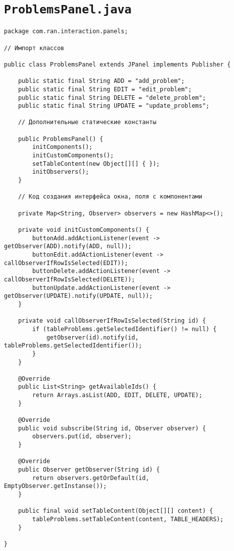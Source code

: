 \section*{\texttt{ProblemsPanel.java}}
\begin{verbatim}
package com.ran.interaction.panels;

// Импорт классов

public class ProblemsPanel extends JPanel implements Publisher {
    
    public static final String ADD = "add_problem";
    public static final String EDIT = "edit_problem";
    public static final String DELETE = "delete_problem";
    public static final String UPDATE = "update_problems";
    
    // Дополнительные статические константы
    
    public ProblemsPanel() {
        initComponents();
        initCustomComponents();
        setTableContent(new Object[][] { });
        initObservers();
    }

    // Код создания интерфейса окна, поля с компонентами

    private Map<String, Observer> observers = new HashMap<>();
    
    private void initCustomComponents() {
        buttonAdd.addActionListener(event -> getObserver(ADD).notify(ADD, null));
        buttonEdit.addActionListener(event -> callObserverIfRowIsSelected(EDIT));
        buttonDelete.addActionListener(event -> callObserverIfRowIsSelected(DELETE));
        buttonUpdate.addActionListener(event -> getObserver(UPDATE).notify(UPDATE, null));
    }
    
    private void callObserverIfRowIsSelected(String id) {
        if (tableProblems.getSelectedIdentifier() != null) {
            getObserver(id).notify(id, tableProblems.getSelectedIdentifier());
        }
    }
    
    @Override
    public List<String> getAvailableIds() {
        return Arrays.asList(ADD, EDIT, DELETE, UPDATE);
    }
    
    @Override
    public void subscribe(String id, Observer observer) {
        observers.put(id, observer);
    }

    @Override
    public Observer getObserver(String id) {
        return observers.getOrDefault(id, EmptyObserver.getInstanse());
    }
    
    public final void setTableContent(Object[][] content) {
        tableProblems.setTableContent(content, TABLE_HEADERS);
    }
    
}
\end{verbatim}

